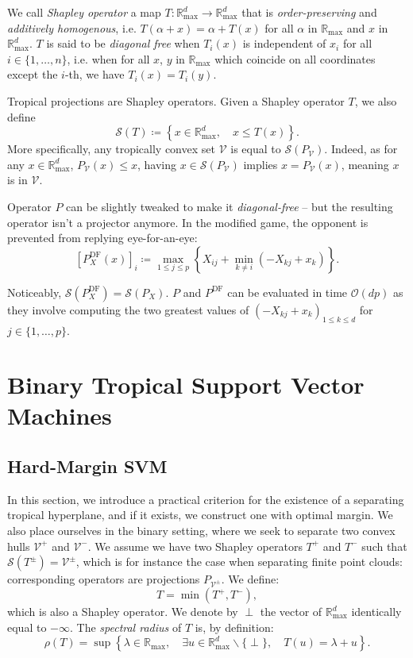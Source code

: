 \documentclass[oneside,UKenglish,a4paper]{amsart}
\numberwithin{equation}{section}
\numberwithin{figure}{section}
\theoremstyle{plain}
\theoremstyle{definition}
\theoremstyle{plain}
\theoremstyle{remark}
\theoremstyle{plain}
\theoremstyle{definition}
\theoremstyle{definition}
\begin{document}
We call \emph{Shapley operator} a map $T:\mathbb{R}_{\max}^{d}\rightarrow\mathbb{R}_{\max}^{d}$
that is \emph{order-preserving} and \emph{additively homogenous}, i.e. $T(\alpha+x)=\alpha+T(x)$
for all $\alpha$ in $\mathbb{R}_{\max}$ and $x$ in $\mathbb{R}_{\max}^{d}$. $T$ is said to be \emph{diagonal free} when $T_{i}(x)$
is independent of $x_{i}$ for all $i\in\{1,\ldots, n\}$, i.e. when for all $x$, $y$ in $\mathbb{R}_{\max}$ which coincide on all coordinates except the $i$-th, we have $T_{i}(x)=T_{i}(y)$. 

Tropical projections are Shapley operators. Given a Shapley operator $T$, we also define
\[
\mathcal{S}(T)\coloneqq\left\{x\in\mathbb{R}_{\max}^{d},\quad x\le T(x)\right\}.
\]
More specifically, any tropically convex set $\mathcal{V}$ is equal
to $\mathcal{S}(P_{\mathcal{V}})$. Indeed, as for any $x\in\mathbb{R}_{\text{max}}^{d}$,
$P_{\mathcal{V}}(x)\le x$, having $x\in\mathcal{S}(P_{\mathcal{V}})$
implies $x=P_{\mathcal{V}}(x)$, meaning $x$ is in
$\mathcal{V}$.


Operator $P$ can be slightly tweaked to make it \emph{diagonal-free} -- but the resulting operator isn't a projector anymore.
In the modified game, the opponent is prevented from replying eye-for-an-eye:
\[
\left[P^{\text{DF}}_X(x)\right]_{i}\coloneqq\max_{1\le j\le p}\left\{ X_{ij}+\min_{k\ne i}(-X_{kj}+x_{k})\right\} .
\]

Noticeably, $\mathcal{S}(P_X^\text{DF}) = \mathcal{S}(P_X)$. $P$ and $P^\text{DF}$ can be evaluated in time $\mathcal{O}(dp)$ as they involve computing the two greatest values of $(-X_{kj}+x_k)_{1 \le k \le d}$ for $j\in\{1,\ldots, p\}$.

\section{Binary Tropical Support Vector Machines}

\subsection{Hard-Margin SVM}
In this section, we introduce a practical criterion for the existence of a separating tropical hyperplane, and if it exists, we construct one with optimal margin. We also place ourselves in the binary setting, where we seek to separate two convex hulls $\mathcal{V}^{+}$
and $\mathcal{V}^{-}$. We assume we have two Shapley operators $T^{+}$
and $T^{-}$ such that $\mathcal{S}(T^{\pm})=\mathcal{V}^{\pm}$,
which is for instance the case when separating finite point clouds:
corresponding operators are projections $P_{\mathcal{V}^{\pm}}$. We define:
\[
T=\min(T^{+},T^{-}),
\]
which is also a Shapley operator. We denote by $\perp$ the vector of $\mathbb{R}_{\max}^{d}$
identically equal to $-\infty$. The \emph{spectral radius} of $T$
is, by definition:
\[
\rho(T)=\sup\left\{\lambda\in\mathbb{R}_{\max},\quad\exists u\in\mathbb{R}_{\max}^{d}\backslash\{\perp\},\quad T(u)=\lambda+u\right\}.
\]
\end{document}

